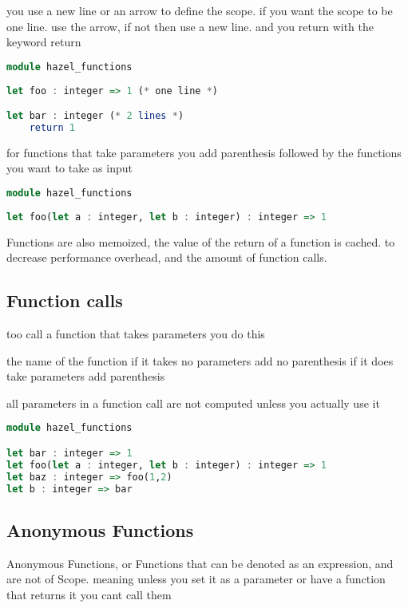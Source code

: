 \documentclass{article}
\begin{document}
you use a new line or an arrow to define the scope. if you want the scope to be one line. use the arrow, if not then use a new line. and you return with the keyword return 

\begin{lstlisting}[language=Haskell, caption=Function definition]
module hazel_functions
        
let foo : integer => 1 (* one line *)

let bar : integer (* 2 lines *)
    return 1 

\end{lstlisting}

for functions that take parameters you add parenthesis followed by the functions you want to take as input


\begin{lstlisting}[language=Haskell, caption=Functions with parameters]
module hazel_functions
        
let foo(let a : integer, let b : integer) : integer => 1

\end{lstlisting}

Functions are also memoized, the value of the return of a function is cached. to decrease performance overhead, and the amount of function calls. 
\subsection{Function calls}

too call a function that takes parameters you do this 

the name of the function if it takes no parameters add no parenthesis if it does 
take parameters add parenthesis 

all parameters in a function call are not computed unless you actually use it

\begin{lstlisting}[language=Haskell, caption=How to define a function call]
module hazel_functions

let bar : integer => 1
let foo(let a : integer, let b : integer) : integer => 1
let baz : integer => foo(1,2)
let b : integer => bar

\end{lstlisting}
\subsection{Anonymous Functions}

Anonymous Functions, or Functions that can be denoted as an expression, and are not of Scope. meaning unless you set it as a parameter or have a function that returns it you cant call them
\end{document}
